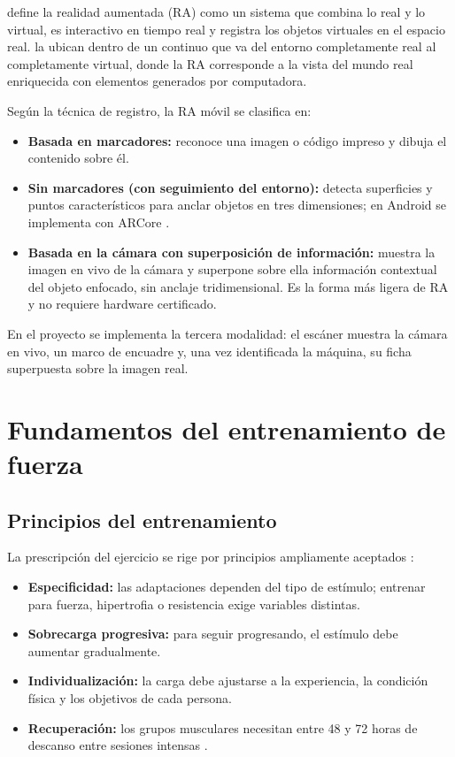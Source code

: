 \citet{azuma1997} define la realidad aumentada (RA) como un sistema que
combina lo real y lo virtual, es interactivo en tiempo real y registra los
objetos virtuales en el espacio real. \citet{milgram1994} la ubican dentro de
un continuo que va del entorno completamente real al completamente virtual,
donde la RA corresponde a la vista del mundo real enriquecida con elementos
generados por computadora.

Según la técnica de registro, la RA móvil se clasifica en:

\begin{itemize}
    \item \textbf{Basada en marcadores:} reconoce una imagen o código impreso y
    dibuja el contenido sobre él.
    \item \textbf{Sin marcadores (con seguimiento del entorno):} detecta
    superficies y puntos característicos para anclar objetos en tres
    dimensiones; en Android se implementa con ARCore \citep{arcore}.
    \item \textbf{Basada en la cámara con superposición de información:}
    muestra la imagen en vivo de la cámara y superpone sobre ella información
    contextual del objeto enfocado, sin anclaje tridimensional. Es la forma
    más ligera de RA y no requiere hardware certificado.
\end{itemize}

En el proyecto se implementa la tercera modalidad: el escáner muestra la
cámara en vivo, un marco de encuadre y, una vez identificada la máquina, su
ficha superpuesta sobre la imagen real.

\section{Fundamentos del entrenamiento de fuerza}
\label{sec:mt-entrenamiento}

\subsection{Principios del entrenamiento}

La prescripción del ejercicio se rige por principios ampliamente aceptados
\citep{acsm2021, kraemer2004}:

\begin{itemize}
    \item \textbf{Especificidad:} las adaptaciones dependen del tipo de
    estímulo; entrenar para fuerza, hipertrofia o resistencia exige variables
    distintas.
    \item \textbf{Sobrecarga progresiva:} para seguir progresando, el estímulo
    debe aumentar gradualmente.
    \item \textbf{Individualización:} la carga debe ajustarse a la experiencia,
    la condición física y los objetivos de cada persona.
    \item \textbf{Recuperación:} los grupos musculares necesitan entre 48 y 72
    horas de descanso entre sesiones intensas \citep{garber2011}.
\end{itemize}


